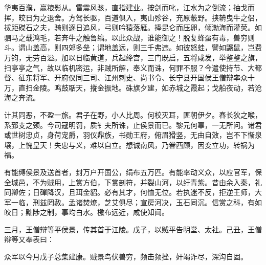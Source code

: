 \documentclass[12pt,UTF8]{ctexbook}
\begin{document}
华夷百濮，赢粮影从。雷震风骇，直指建业。按剑而叱，江水为之倒流；抽戈而挥，皎日为之退舍。方驾长驱，百道俱入，夷山殄谷，充原蔽野。挟辀曳牛之侣，拔距磔石之夫，骑则逐日追风，弓则吟猿落雁。捧昆仑而压卵，倾渤海而灌荧。如驷马之载鸿毛，若奔牛之触鲁缟。以此众战，谁能御之！脱复蜂虿有毒，兽穷则斗。谓山盖高，则四郊多垒；谓地盖远，则三千弗违。如彼怒蛙，譬如鼷鼠，岂费万钧，无劳百溢。加以日临黄道，兵起绛宫，三门既启，五将咸发，举整整之旗，扫亭亭之气，故以临机密运，非贼所解，奉义而诛，何罪不服？今遣使持节、大都督、征东将军、开府仪同三司、江州刺史、尚书令、长宁县开国侯王僧辩率众十万，直扫金陵。鸣鼓聒天，摐金振地。硃旗夕建，如赤城之霞起；戈船夜动，若沧海之奔流。

计其同恶，不盈一旅。君子在野，小人比周。何校灭耳，匪朝伊夕。舂长狄之喉，系郅支之颈。今司寇明罚，质钅夫所诛，止侯景而已。黎元何辜，一无所问。诸君或世树忠贞，身荷宠爵，羽仪鼎族，书勋王府，俯眉猾竖，无由自效，岂不下惭泉壤，上愧皇天！失忠与义，难以自立。想诚南风，乃眷西顾，因变立功，转祸为福。

有能缚侯景及送首者，封万户开国公，绢布五万匹。有能率动义众，以应官军，保全城邑，不为贼用，上赏方伯，下赏剖符，并裂山河，以纡青紫。昔由余入秦，礼同卿佐；日磾降汉，且珥金貂。必有其才，何恤无位。若执迷不反，拒逆王师，大军一临，刑兹罔赦。孟诸焚燎，芝艾俱尽；宣房河决，玉石同沉。信赏之科，有如皎日；黜陟之制，事均白水。檄布远近，咸使知闻。

三月，王僧辩等平侯景，传其首于江陵。戊子，以贼平告明堂、太社。己丑，王僧辩等又奉表曰：

众军以今月戊子总集建康。贼景鸟伏兽穷，频击频挫，奸竭诈尽，深沟自固。
\end{document}
